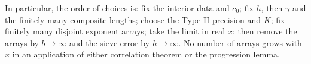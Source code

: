In particular, the order of choices is: fix the interior data
and $c_0$; fix $h$, then $\gamma$ and the finitely many composite
lengths; choose the Type II precision and $K$; fix finitely many
disjoint exponent arrays; take the limit in real $x$; then
remove the arrays by $b\to\infty$ and the sieve error by
$h\to\infty$.  No number of arrays grows with $x$ in an
application of either correlation theorem or the progression
lemma.
